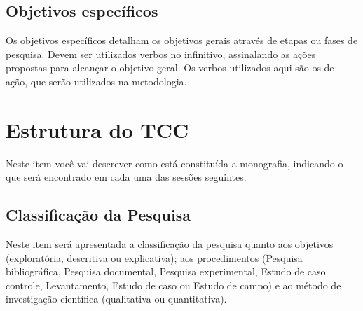 \subsection{Objetivos específicos}
Os objetivos específicos detalham os objetivos gerais através de etapas ou fases
de pesquisa. Devem ser utilizados verbos no infinitivo, assinalando as ações
propostas para alcançar o objetivo geral. Os verbos utilizados aqui são os de
ação, que serão utilizados na metodologia.


\section{Estrutura do TCC}
Neste item você vai descrever como está constituída a monografia, indicando o
que será encontrado em cada uma das sessões seguintes.

\subsection{Classificação da Pesquisa}
Neste item será apresentada a classificação da pesquisa quanto aos objetivos
(exploratória, descritiva ou explicativa); aos procedimentos (Pesquisa
bibliográfica, Pesquisa documental, Pesquisa experimental, Estudo de caso
controle, Levantamento, Estudo de caso ou Estudo de campo) e ao método de
investigação científica (qualitativa ou quantitativa).